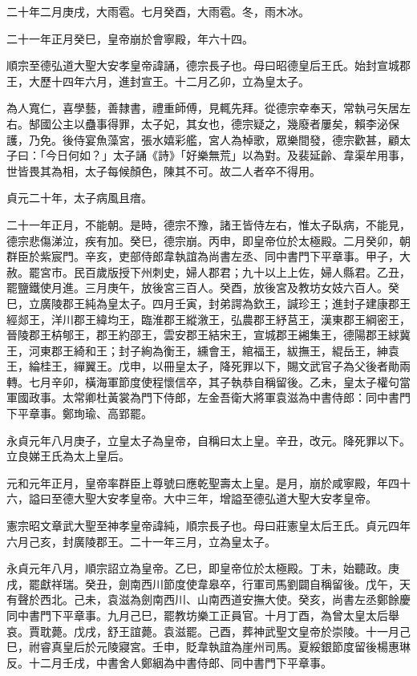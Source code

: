 \begin{pinyinscope}
 二十年二月庚戌，大雨雹。七月癸酉，大雨雹。冬，雨木冰。



 二十一年正月癸巳，皇帝崩於會寧殿，年六十四。



 順宗至德弘道大聖大安孝皇帝諱誦，德宗長子也。母曰昭德皇后王氏。始封宣城郡王，大歷十四年六月，進封宣王。十二月乙卯，立為皇太子。



 為人寬仁，喜學藝，善隸書，禮重師傅，見輒先拜。從德宗幸奉天，常執弓矢居左右。郜國公主以蠱事得罪，太子妃，其女也，德宗疑之，幾廢者屢矣，賴李泌保護，乃免。後侍宴魚藻宮，張水嬉彩艦，宮人為棹歌，眾樂間發，德宗歡甚，顧太子曰：「今日何如？」太子誦《詩》「好樂無荒」以為對。及裴延齡、韋渠牟用事，世皆畏其為相，太子每候顏色，陳其不可。故二人者卒不得用。



 貞元二十年，太子病風且瘖。



 二十一年正月，不能朝。是時，德宗不豫，諸王皆侍左右，惟太子臥病，不能見，德宗悲傷涕泣，疾有加。癸巳，德宗崩。丙申，即皇帝位於太極殿。二月癸卯，朝群臣於紫宸門。辛亥，吏部侍郎韋執誼為尚書左丞、同中書門下平章事。甲子，大赦。罷宮市。民百歲版授下州刺史，婦人郡君；九十以上上佐，婦人縣君。乙丑，罷鹽鐵使月進。三月庚午，放後宮三百人。癸酉，放後宮及教坊女妓六百人。癸巳，立廣陵郡王純為皇太子。四月壬寅，封弟諤為欽王，諴珍王；進封子建康郡王經郯王，洋川郡王緯均王，臨淮郡王縱漵王，弘農郡王紓莒王，漢東郡王綱密王，晉陵郡王枿郇王，郡王約邵王，雲安郡王結宋王，宣城郡王緗集王，德陽郡王絿冀王，河東郡王綺和王；封子絢為衡王，纁會王，綰福王，紱撫王，緄岳王，紳袁王，綸桂王，繟翼王。戊申，以冊皇太子，降死罪以下，賜文武官子為父後者勛兩轉。七月辛卯，橫海軍節度使程懷信卒，其子執恭自稱留後。乙未，皇太子權句當軍國政事。太常卿杜黃裳為門下侍郎，左金吾衛大將軍袁滋為中書侍郎：同中書門下平章事。鄭珣瑜、高郢罷。



 永貞元年八月庚子，立皇太子為皇帝，自稱曰太上皇。辛丑，改元。降死罪以下。立良娣王氏為太上皇后。



 元和元年正月，皇帝率群臣上尊號曰應乾聖壽太上皇。是月，崩於咸寧殿，年四十六，謚曰至德大聖大安孝皇帝。大中三年，增謚至德弘道大聖大安孝皇帝。



 憲宗昭文章武大聖至神孝皇帝諱純，順宗長子也。母曰莊憲皇太后王氏。貞元四年六月己亥，封廣陵郡王。二十一年三月，立為皇太子。



 永貞元年八月，順宗詔立為皇帝。乙巳，即皇帝位於太極殿。丁未，始聽政。庚戌，罷獻祥瑞。癸丑，劍南西川節度使韋皋卒，行軍司馬劉闢自稱留後。戊午，天有聲於西北。己未，袁滋為劍南西川、山南西道安撫大使。癸亥，尚書左丞鄭餘慶同中書門下平章事。九月己巳，罷教坊樂工正員官。十月丁酉，為曾太皇太后舉哀。賈耽薨。戊戌，舒王誼薨。袁滋罷。己酉，葬神武聖文皇帝於崇陵。十一月己巳，祔睿真皇后於元陵寢宮。壬申，貶韋執誼為崖州司馬。夏綏銀節度留後楊惠琳反。十二月壬戌，中書舍人鄭絪為中書侍郎、同中書門下平章事。




\end{pinyinscope}
